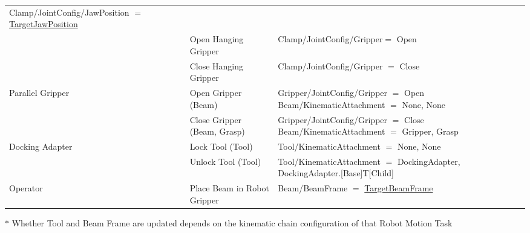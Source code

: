 \begin{table}[H]
\begin{adjustbox}{max width=\textwidth}
\begin{tabular}{p{2.38cm}p{5.42cm}p{8.21cm}}
\multicolumn{1}{|p{8.21cm}|}{{\footnotesize Clamp/JointConfig/JawPosition $=$ \uline{TargetJawPosition}}} \\ 
\hhline{~--}
\multicolumn{1}{|p{2.38cm}}{} & 
\multicolumn{1}{|p{5.42cm}}{{\footnotesize Open Hanging Gripper}} & 
\multicolumn{1}{|p{8.21cm}|}{{\footnotesize Clamp/JointConfig/Gripper$=$ Open}} \\ 
\hhline{~--}
\multicolumn{1}{|p{2.38cm}}{} & 
\multicolumn{1}{|p{5.42cm}}{{\footnotesize Close Hanging Gripper}} & 
\multicolumn{1}{|p{8.21cm}|}{{\footnotesize Clamp/JointConfig/Gripper $=$ Close}} \\ 
\hline
\multicolumn{1}{|p{2.38cm}}{\multirow{2}{*}{\parbox{2.38cm}{{\footnotesize Parallel Gripper}}}} & 
\multicolumn{1}{|p{5.42cm}}{{\footnotesize Open Gripper (Beam)}} & 
\multicolumn{1}{|p{8.21cm}|}{{\footnotesize Gripper/JointConfig/Gripper $=$ Open} \newline
{\footnotesize Beam/KinematicAttachment $=$ None, None}} \\ 
\hhline{~--}
\multicolumn{1}{|p{2.38cm}}{} & 
\multicolumn{1}{|p{5.42cm}}{{\footnotesize Close Gripper (Beam, Grasp)}} & 
\multicolumn{1}{|p{8.21cm}|}{{\footnotesize Gripper/JointConfig/Gripper $=$ Close} \newline
{\footnotesize Beam/KinematicAttachment $=$ Gripper, Grasp}} \\ 
\hline
\multicolumn{1}{|p{2.38cm}}{\multirow{2}{*}{\parbox{2.38cm}{{\footnotesize Docking Adapter}}}} & 
\multicolumn{1}{|p{5.42cm}}{{\footnotesize Lock Tool (Tool)}} & 
\multicolumn{1}{|p{8.21cm}|}{{\footnotesize Tool/KinematicAttachment $=$ None, None}} \\ 
\hhline{~--}
\multicolumn{1}{|p{2.38cm}}{} & 
\multicolumn{1}{|p{5.42cm}}{{\footnotesize Unlock Tool (Tool)}} & 
\multicolumn{1}{|p{8.21cm}|}{{\footnotesize Tool/KinematicAttachment $=$ DockingAdapter, DockingAdapter.[Base]T[Child]}} \\ 
\hline
\multicolumn{1}{|p{2.38cm}}{{\footnotesize Operator}} & 
\multicolumn{1}{|p{5.42cm}}{{\footnotesize Place Beam in Robot Gripper}} & 
\multicolumn{1}{|p{8.21cm}|}{{\footnotesize Beam/BeamFrame $=$ \uline{TargetBeamFrame}}} \\ 
\hline
\end{tabular}
\end{adjustbox}
\end{table}
\vspace{4\baselineskip}
{\footnotesize $\ast$ Whether Tool and Beam Frame are updated depends on the kinematic chain configuration of that Robot Motion Task\par}

